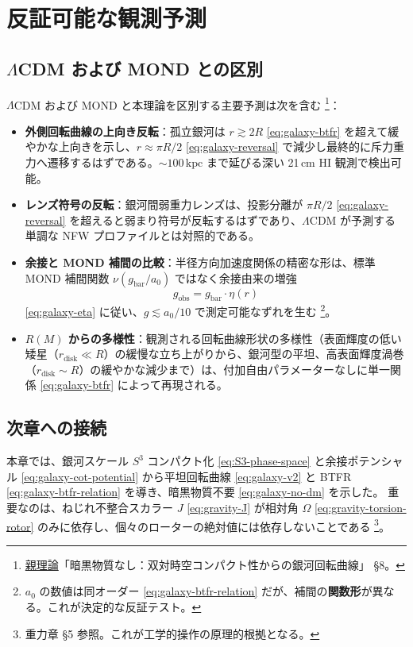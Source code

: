\documentclass[dvipdfmx,a4paper,oneside]{jsbook}
\numberwithin{equation}{chapter}
\begin{document}
\section{反証可能な観測予測}

\subsection{\(\Lambda\)CDM および MOND との区別}

\(\Lambda\)CDM および MOND と本理論を区別する主要予測は次を含む \footnote{\hyperref[sec:sister-manuscripts]{親理論}「暗黒物質なし：双対時空コンパクト性からの銀河回転曲線」 §8。}：
\begin{itemize}[leftmargin=2em]
  \item \textbf{外側回転曲線の上向き反転}：孤立銀河は \(r \gtrsim 2R\) \eqref{eq:galaxy-btfr} を超えて緩やかな上向きを示し、\(r \approx \pi R/2\) \eqref{eq:galaxy-reversal} で減少し最終的に斥力重力へ遷移するはずである。\(\sim 100\,\mathrm{kpc}\) まで延びる深い 21\,cm HI 観測で検出可能。
  \item \textbf{レンズ符号の反転}：銀河間弱重力レンズは、投影分離が \(\pi R/2\) \eqref{eq:galaxy-reversal} を超えると弱まり符号が反転するはずであり、\(\Lambda\)CDM が予測する単調な NFW プロファイルとは対照的である。
  \item \textbf{余接と MOND 補間の比較}：半径方向加速度関係の精密な形は、標準 MOND 補間関数 \(\nu(g_{\mathrm{bar}}/a_0)\) ではなく余接由来の増強
  \begin{equation}
    g_{\mathrm{obs}} = g_{\mathrm{bar}} \cdot \eta(r)
    \label{eq:galaxy-g-obs}
  \end{equation}
  \eqref{eq:galaxy-eta} に従い、\(g \lesssim a_0/10\) で測定可能なずれを生む \footnote{\(a_0\) の数値は同オーダー \eqref{eq:galaxy-btfr-relation} だが、補間の\textbf{関数形}が異なる。これが決定的な反証テスト。}。
  \item \textbf{\(R(M)\) からの多様性}：観測される回転曲線形状の多様性（表面輝度の低い矮星（\(r_{\mathrm{disk}} \ll R\)）の緩慢な立ち上がりから、銀河型の平坦、高表面輝度渦巻（\(r_{\mathrm{disk}} \sim R\)）の緩やかな減少まで）は、付加自由パラメーターなしに単一関係 \eqref{eq:galaxy-btfr} によって再現される。
\end{itemize}

\subsection{次章への接続}

本章では、銀河スケール \(S^3\) コンパクト化 \eqref{eq:S3-phase-space} と余接ポテンシャル \eqref{eq:galaxy-cot-potential} から平坦回転曲線 \eqref{eq:galaxy-v2} と BTFR \eqref{eq:galaxy-btfr-relation} を導き、暗黒物質不要 \eqref{eq:galaxy-no-dm} を示した。
重要なのは、ねじれ不整合スカラー \(J\) \eqref{eq:gravity-J} が相対角 \(\Omega\) \eqref{eq:gravity-torsion-rotor} のみに依存し、個々のローターの絶対値には依存しないことである \footnote{重力章 §5 参照。これが工学的操作の原理的根拠となる。}。
\end{document}
